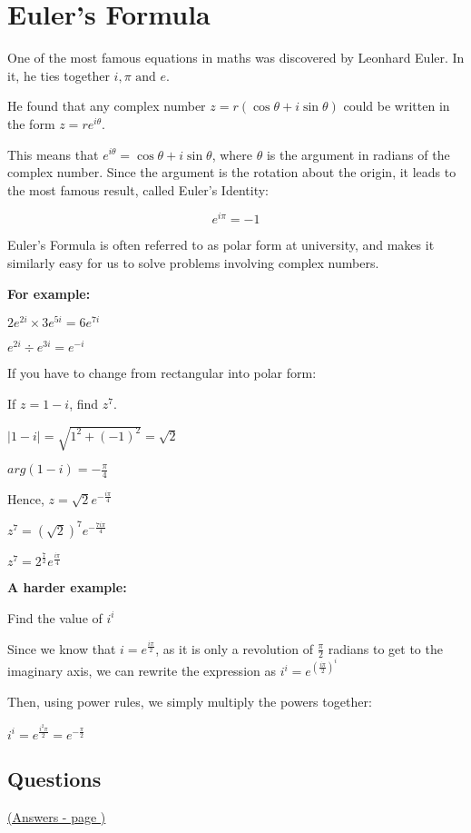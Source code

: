\documentclass[../main.tex]{subfiles}
\begin{document}
\section{Euler's Formula}
One of the most famous equations in maths was discovered by Leonhard Euler. In it, he ties together \(i,\pi \text{ and } e\).

He found that any complex number \(z=r(\cos{\theta}+i\sin{\theta})\) could be written in the form \(z=re^{i\theta}\).

This means that \(e^{i\theta}=\cos{\theta}+i\sin{\theta}\), where \(\theta\) is the argument in radians of the complex number. Since the argument is the rotation about the origin, it leads to the most famous result, called Euler's Identity:

\[e^{i\pi}=-1\]

Euler's Formula is often referred to as polar form at university, and makes it similarly easy for us to solve problems involving complex numbers.

\textbf{For example:}

\(2e^{2i} \times 3e^{5i}=6e^{7i}\)

\(e^{2i} \div e^{3i}=e^{-i}\)

If you have to change from rectangular into polar form:

If \(z=1-i\), find \(z^7\).

\(|1-i|=\sqrt{1^2+(-1)^2}=\sqrt{2}\)

\(arg(1-i)=-\frac{\pi}{4}\)

Hence, \(z=\sqrt{2}e^{-\frac{i\pi }{4}}\)

\(z^7=(\sqrt{2})^7 e^{-\frac{7i\pi}{4}}\)

\(z^7=2^{\frac{7}{2}}e^{\frac{i\pi}{4}}\)

\textbf{A harder example:}

Find the value of \(i^i\)

Since we know that \(i=e^{\frac{i\pi}{2}}\), as it is only a revolution of \(\frac{\pi}{2}\) radians to get to the imaginary axis, we can rewrite the expression as \(i^i=e^{(\frac{i\pi}{2})^{i}}\)

Then, using power rules, we simply multiply the powers together:

\(i^i=e^{\frac{i^2\pi}{2}}=e^{-\frac{\pi}{2}}\)


\pagebreak
\hypertarget{eulersformulalink}{\subsection*{Questions}}
\hyperlink{eulersformulaanswers}{(Answers - page {\pageref*{Eulers answers}})}
\end{document}

